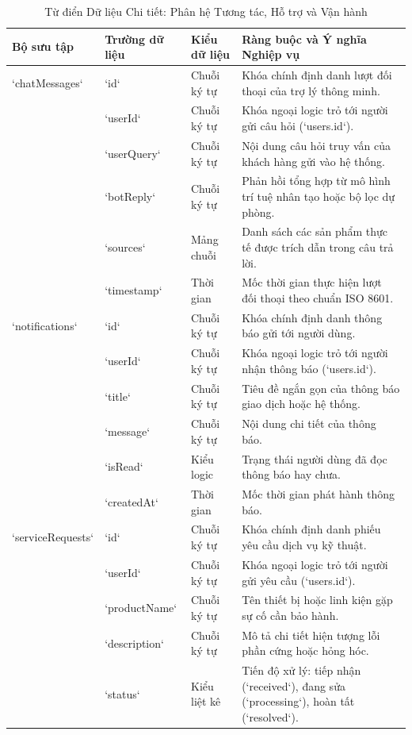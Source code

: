 \begin{table}[H]
\centering
\caption{Từ điển Dữ liệu Chi tiết: Phân hệ Tương tác, Hỗ trợ và Vận hành}
\label{tab:dict_operations}
\begin{tabularx}{\textwidth}{p{2.5cm}p{2.3cm}p{1.8cm}X}
\toprule
\textbf{Bộ sưu tập} & \textbf{Trường dữ liệu} & \textbf{Kiểu dữ liệu} & \textbf{Ràng buộc và Ý nghĩa Nghiệp vụ} \\
\midrule
`chatMessages` & `id` & Chuỗi ký tự & Khóa chính định danh lượt đối thoại của trợ lý thông minh. \\
& `userId` & Chuỗi ký tự & Khóa ngoại logic trỏ tới người gửi câu hỏi (`users.id`). \\
& `userQuery` & Chuỗi ký tự & Nội dung câu hỏi truy vấn của khách hàng gửi vào hệ thống. \\
& `botReply` & Chuỗi ký tự & Phản hồi tổng hợp từ mô hình trí tuệ nhân tạo hoặc bộ lọc dự phòng. \\
& `sources` & Mảng chuỗi & Danh sách các sản phẩm thực tế được trích dẫn trong câu trả lời. \\
& `timestamp` & Thời gian & Mốc thời gian thực hiện lượt đối thoại theo chuẩn ISO 8601. \\
\addlinespace
`notifications` & `id` & Chuỗi ký tự & Khóa chính định danh thông báo gửi tới người dùng. \\
& `userId` & Chuỗi ký tự & Khóa ngoại logic trỏ tới người nhận thông báo (`users.id`). \\
& `title` & Chuỗi ký tự & Tiêu đề ngắn gọn của thông báo giao dịch hoặc hệ thống. \\
& `message` & Chuỗi ký tự & Nội dung chi tiết của thông báo. \\
& `isRead` & Kiểu logic & Trạng thái người dùng đã đọc thông báo hay chưa. \\
& `createdAt` & Thời gian & Mốc thời gian phát hành thông báo. \\
\addlinespace
`serviceRequests`& `id` & Chuỗi ký tự & Khóa chính định danh phiếu yêu cầu dịch vụ kỹ thuật. \\
& `userId` & Chuỗi ký tự & Khóa ngoại logic trỏ tới người gửi yêu cầu (`users.id`). \\
& `productName` & Chuỗi ký tự & Tên thiết bị hoặc linh kiện gặp sự cố cần bảo hành. \\
& `description` & Chuỗi ký tự & Mô tả chi tiết hiện tượng lỗi phần cứng hoặc hỏng hóc. \\
& `status` & Kiểu liệt kê & Tiến độ xử lý: tiếp nhận (`received`), đang sửa (`processing`), hoàn tất (`resolved`). \\

\end{tabularx}
\end{table}
